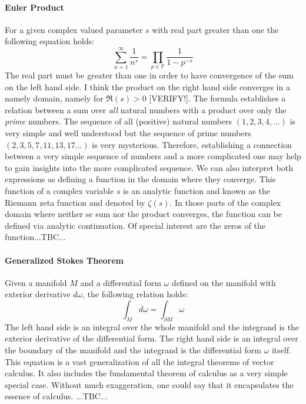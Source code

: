 \paragraph{Euler Product}
For a given complex valued parameter $s$ with real part greater than one the following equation holds:
\begin{equation}
\sum_{n=1}^{\infty} \frac{1}{n^s} = 
\prod_{p \in \mathbb{P}} \frac{1}{1 - p^{-s}}
\end{equation}
The real part must be greater than one in order to have convergence of the sum on the left hand side. I think the product on the right hand side converges in a namely domain, namely for $\Re(s) > 0$ [VERIFY!]. The formula establishes a relation between a sum over \emph{all} natural numbers with a product over only the \emph{prime} numbers. The sequence of all (positive) natural numbers $(1,2,3,4,\ldots)$ is very simple and well understood but the sequence of prime numbers $(2,3,5,7,11,13,17\ldots)$ is very mysterious. Therefore, establishing a connection between a very simple sequence of numbers and a more complicated one may help to gain insights into the more complicated sequence. We can also interpret both expressions as defining a function in the domain where they converge. This function of a complex variable $s$ is an analytic function and known as the Riemann zeta function and denoted by $\zeta(s)$. In those parts of the complex domain where neither se sum nor the product converges, the function can be defined via analytic continuation. Of special interest are the zeros of the function...TBC...


\paragraph{Generalized Stokes Theorem}
Given a manifold $M$ and a differential form $\omega$ defined on the manifold with exterior derivative $d \omega$, the following relation holds:
\begin{equation}
\int_{M} d \omega = \int_{\partial M} \omega
\end{equation}
The left hand side is an integral over the whole manifold and the integrand is the exterior derivative of the differential form. The right hand side is an integral over the boundary of the manifold and the integrand is the differential form $\omega$ itself. This equation is a vast generalization of all the integral theorems of vector calculus. It also includes the fundamental theorem of calculus as a very simple special case. Without much exaggeration, one could say that it encapsulates the essence of calculus. ...TBC...


